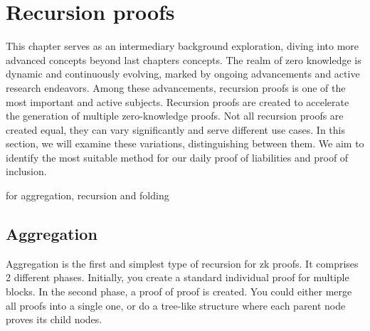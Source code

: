 

\chapter{Recursion proofs}


This chapter serves as an intermediary background exploration,
diving into more advanced concepts beyond last chapters concepts.
The realm of zero knowledge is dynamic and continuously evolving,
marked by ongoing advancements and active research endeavors. Among these advancements,
recursion proofs is one of the most important and active subjects. Recursion proofs are created to accelerate
the generation of multiple zero-knowledge proofs.
Not all recursion proofs are created equal, they can vary significantly and serve different use cases.
In this section, we will examine these variations, distinguishing between them.
We aim to identify the most suitable method for our daily proof of liabilities and proof of inclusion.




\cite{Nova23} for aggregation, recursion and folding


\section{Aggregation}
Aggregation is the first and simplest type of recursion for zk proofs. It comprises 2 different phases.
Initially, you create a standard individual proof for multiple blocks. In the second phase, a proof of proof is created.
You could either merge all proofs into a single one, or do a tree-like structure where each parent node proves its child nodes.


